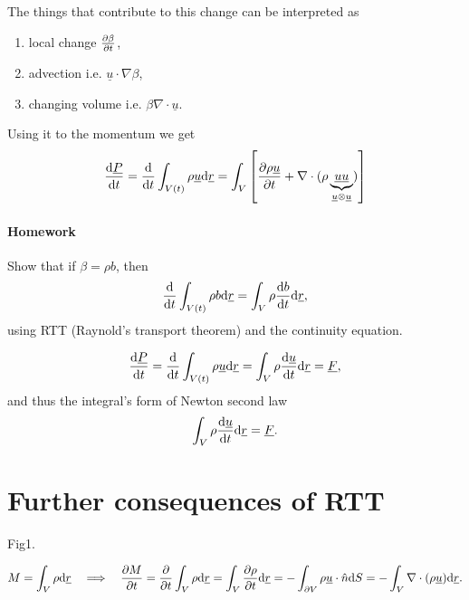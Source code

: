 \documentclass[11pt,oneside]{book}
\renewcommand{\vec}[1]{\underline{#1}}
\theoremstyle{definition} %
\theoremstyle{plain} %
\theoremstyle{remark} %
\theoremstyle{underline}
\begin{document}
  The things that contribute to this change can be interpreted as
  \begin{enumerate}
    \item local change $\frac{\partial \beta}{\partial t}$,
    \item advection i.e. $\vec u \cdot \nabla \beta$,
    \item changing volume i.e. $\beta \nabla\cdot \vec u$.
  \end{enumerate}

  Using it to the momentum we get
  \begin{displaymath}
    \dfrac{\vec P }{t} = \dfrac{}{t} \int_{V(t)} \rho \vec u \d \vec r 
    = \int_V \left[ \ptf{\rho\vec u }{t} + \nabla \cdot (\rho \underbrace{\vec u \vec u}_{\vec u \otimes \vec u}) \right]
  \end{displaymath}
  
  \paragraph{Homework} Show that if $\beta = \rho b$, then 
  \begin{displaymath}
    \dfrac{}{t} \int_{V(t)} \rho b \d \vec r = \int_{V} \rho \dfrac{b}{t} \d \vec r,
  \end{displaymath}
  using RTT (Raynold's transport theorem) and the continuity equation.
  
  \begin{displaymath}
    \dfrac{\vec P}{t} = \dfrac{}{t} \int_{V(t)} \rho \vec u \d \vec r 
    = \int_V \rho \dfrac{\vec u}{t} \d \vec r 
    = \vec F,
  \end{displaymath}
  and thus the integral's form of Newton second law
  \begin{displaymath}
    \int_V \rho \dfrac{\vec u}{t} \d \vec r = \vec F.
  \end{displaymath}
  
  \section{Further consequences of RTT}
  \todo Fig1.
  
  \begin{displaymath}
    M = \int_V \rho \d \vec r \qLRa \ptf{M}{t} 
    = \ptf{}{t} \int_V \rho \d \vec r 
    = \int_V \ptf{\rho}{t} \d \vec r 
    = - \int_{\partial V} \rho \vec u \cdot \hat n \d S 
    = - \int_V \nabla \cdot (\rho \vec u) \d \vec r.
  \end{displaymath}
\end{document}
